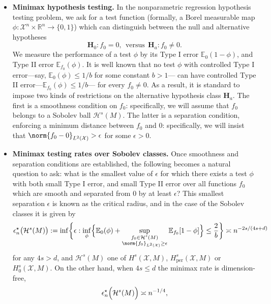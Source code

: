 \documentclass{article}
\newcommand{\Reals}{\mathbb{R}}
\newcommand{\1}{\mathbf{1}}
\newcommand{\Xset}{\mathcal{X}}
\newcommand{\Leb}{L}
\newcommand{\mc}[1]{\mathcal{#1}}
\newcommand{\Ebb}{\mathbb{E}}
\theoremstyle{alden}
\theoremstyle{aldenthm}
\theoremstyle{definition}
\theoremstyle{remark}
\begin{document}
\begin{itemize}
	\item \textbf{Minimax hypothesis testing.} In the nonparametric regression hypothesis testing problem, we ask for a test function (formally, a Borel measurable map $\phi: \mc{X}^n \times \Reals^n \to \{0,1\}$) which can distinguish between the null and alternative hypotheses
	\begin{equation}
	\mathbf{H}_0: f_0 = 0, ~~\textrm{versus}~~ \mathbf{H}_a: f_0 \neq 0.
	\end{equation}
	We measure the performance of a test $\phi$ by its Type I error $\Ebb_0(1 - \phi)$, and Type II error $\mathbb{E}_{f_0}(\phi)$. It is well known that no test $\phi$ with controlled Type I error---say, $\Ebb_0(\phi) \leq 1/b$ for some constant $b > 1$---
	can have controlled Type II error---$\Ebb_{f_0}(\phi) \leq 1/b$--- for every $f_0 \neq 0$. As a result, it is standard to impose two kinds of restrictions on the alternative hypothesis class $\mathbf{H}_a$. The first is a smoothness condition on $f_0$: specifically, we will assume that $f_0$ belongs to a Sobolev ball $\mc{H}^s(M)$. The latter is a separation condition, enforcing a minimum distance between $f_0$ and $0$: specifically, we will insist that $\norm{f_0  - 0}_{\Leb^2(\Xset)} > \epsilon$ for some $\epsilon > 0$.
	\item\textbf{Minimax testing rates over Sobolev classes.} Once smoothness and separation conditions are established, the following becomes a natural question to ask: what is the smallest value of $\epsilon$ for which there exists a test $\phi$ with both small Type I error, and small Type II error over all functions $f_0$ which are smooth and separated from $0$ by at least $\epsilon$? This smallest separation $\epsilon$ is known as the critical radius, and in the case of the Sobolev classes it is given by
	\begin{equation*}
	\epsilon_n^{\star}\bigl(\mc{H}^s(M)\bigr):= \inf\biggl\{\epsilon: \inf_{\phi} \Bigl\{\Ebb_0(\phi) +  \sup_{\substack{f_0 \in \mc{H}^s(M) \\ \norm{f_0}_{\Leb^2(\Xset)} \geq \epsilon}} \Ebb_{f_0}[1 - \phi]\Bigr\} \leq \frac{2}{b} \biggr\} \asymp n^{-2s/(4s + d)}
	\end{equation*}
	for any $4s > d$, and $\mc{H}^s(M)$ one of $H^s(\Xset,M)$, $H_{\mathrm{per}}^s(\Xset,M)$ or $H_0^s(\Xset,M)$. On the other hand, when $4s \leq d$ the minimax rate is dimension-free,
	\begin{equation*}
	\epsilon_n^{\star}\Bigl(\mc{H}^s(M)\Bigr) \asymp n^{-1/4},

\end{equation*}
\end{itemize}
\end{document}
